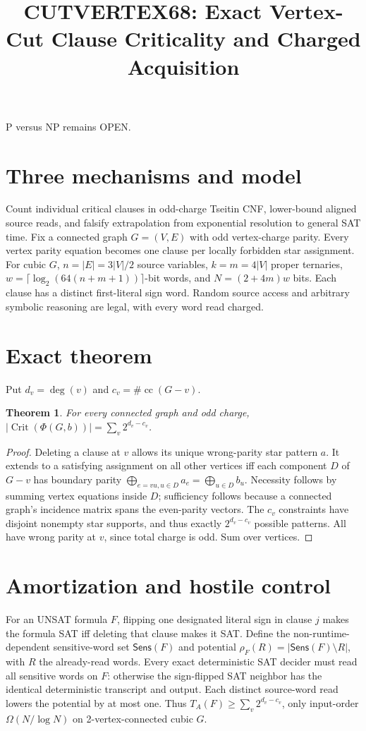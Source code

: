 \documentclass{article}
\title{CUTVERTEX68: Exact Vertex-Cut Clause Criticality and Charged Acquisition}
\newtheorem{theorem}{Theorem}
\begin{document}
\maketitle
P versus NP remains OPEN.
\section{Three mechanisms and model}
Count individual critical clauses in odd-charge Tseitin CNF, lower-bound aligned source reads, and falsify extrapolation from exponential resolution to general SAT time. Fix a connected graph $G=(V,E)$ with odd vertex-charge parity. Every vertex parity equation becomes one clause per locally forbidden star assignment. For cubic $G$, $n=|E|=3|V|/2$ source variables, $k=m=4|V|$ proper ternaries, $w=\lceil\log_2(64(n+m+1))\rceil$-bit words, and $N=(2+4m)w$ bits. Each clause has a distinct first-literal sign word. Random source access and arbitrary symbolic reasoning are legal, with every word read charged.
\section{Exact theorem}
Put $d_v=\deg(v)$ and $c_v=\#\operatorname{cc}(G-v)$.
\begin{theorem}
For every connected graph and odd charge,
$|\operatorname{Crit}(\Phi(G,b))|=\sum_v 2^{d_v-c_v}$.
\end{theorem}
\begin{proof}
Deleting a clause at $v$ allows its unique wrong-parity star pattern $a$. It extends to a satisfying assignment on all other vertices iff each component $D$ of $G-v$ has boundary parity $\bigoplus_{e=vu,u\in D}a_e=\bigoplus_{u\in D}b_u$. Necessity follows by summing vertex equations inside $D$; sufficiency follows because a connected graph's incidence matrix spans the even-parity vectors. The $c_v$ constraints have disjoint nonempty star supports, and thus exactly $2^{d_v-c_v}$ possible patterns. All have wrong parity at $v$, since total charge is odd. Sum over vertices.
\end{proof}
\section{Amortization and hostile control}
For an UNSAT formula $F$, flipping one designated literal sign in clause $j$ makes the formula SAT iff deleting that clause makes it SAT. Define the non-runtime-dependent sensitive-word set $\mathsf{Sens}(F)$ and potential $\rho_F(R)=|\mathsf{Sens}(F)\setminus R|$, with $R$ the already-read words. Every exact deterministic SAT decider must read all sensitive words on $F$: otherwise the sign-flipped SAT neighbor has the identical deterministic transcript and output. Each distinct source-word read lowers the potential by at most one. Thus $T_A(F)\ge\sum_v2^{d_v-c_v}$, only input-order $\Omega(N/\log N)$ on 2-vertex-connected cubic $G$.
\end{document}
